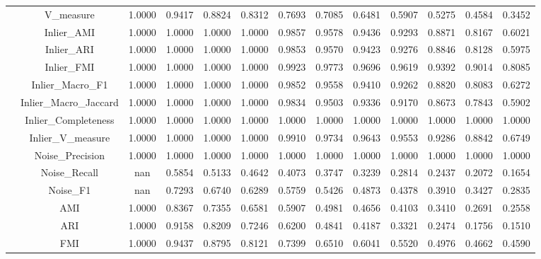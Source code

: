 \begin{table}[ht!]
\begin{tabular*}{\linewidth}{@{} lc c c c c c c c c c c c @{}}
 & V_measure  & 1.0000 & 0.9417 & 0.8824 & 0.8312 & 0.7693 & 0.7085 & 0.6481 & 0.5907 & 0.5275 & 0.4584 & 0.3452 \\

 & Inlier_AMI  & 1.0000 & 1.0000 & 1.0000 & 1.0000 & 0.9857 & 0.9578 & 0.9436 & 0.9293 & 0.8871 & 0.8167 & 0.6021 \\

 & Inlier_ARI  & 1.0000 & 1.0000 & 1.0000 & 1.0000 & 0.9853 & 0.9570 & 0.9423 & 0.9276 & 0.8846 & 0.8128 & 0.5975 \\

 & Inlier_FMI  & 1.0000 & 1.0000 & 1.0000 & 1.0000 & 0.9923 & 0.9773 & 0.9696 & 0.9619 & 0.9392 & 0.9014 & 0.8085 \\

 & Inlier_Macro_F1  & 1.0000 & 1.0000 & 1.0000 & 1.0000 & 0.9852 & 0.9558 & 0.9410 & 0.9262 & 0.8820 & 0.8083 & 0.6272 \\

 & Inlier_Macro_Jaccard  & 1.0000 & 1.0000 & 1.0000 & 1.0000 & 0.9834 & 0.9503 & 0.9336 & 0.9170 & 0.8673 & 0.7843 & 0.5902 \\

 & Inlier_Completeness  & 1.0000 & 1.0000 & 1.0000 & 1.0000 & 1.0000 & 1.0000 & 1.0000 & 1.0000 & 1.0000 & 1.0000 & 1.0000 \\

 & Inlier_V_measure  & 1.0000 & 1.0000 & 1.0000 & 1.0000 & 0.9910 & 0.9734 & 0.9643 & 0.9553 & 0.9286 & 0.8842 & 0.6749 \\

 & Noise_Precision  & 1.0000 & 1.0000 & 1.0000 & 1.0000 & 1.0000 & 1.0000 & 1.0000 & 1.0000 & 1.0000 & 1.0000 & 1.0000 \\

 & Noise_Recall  & nan & 0.5854 & 0.5133 & 0.4642 & 0.4073 & 0.3747 & 0.3239 & 0.2814 & 0.2437 & 0.2072 & 0.1654 \\

 & Noise_F1  & nan & 0.7293 & 0.6740 & 0.6289 & 0.5759 & 0.5426 & 0.4873 & 0.4378 & 0.3910 & 0.3427 & 0.2835 \\
\addlinespace
\multirow{17}{*}{DPC-FWSN}
 & AMI  & 1.0000 & 0.8367 & 0.7355 & 0.6581 & 0.5907 & 0.4981 & 0.4656 & 0.4103 & 0.3410 & 0.2691 & 0.2558 \\

 & ARI  & 1.0000 & 0.9158 & 0.8209 & 0.7246 & 0.6200 & 0.4841 & 0.4187 & 0.3321 & 0.2474 & 0.1756 & 0.1510 \\

 & FMI  & 1.0000 & 0.9437 & 0.8795 & 0.8121 & 0.7399 & 0.6510 & 0.6041 & 0.5520 & 0.4976 & 0.4662 & 0.4590 \\


\end{tabular*}
\end{table}
